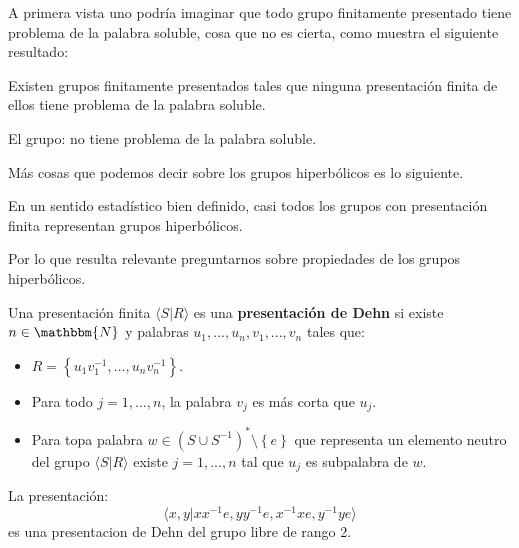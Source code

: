 \documentclass[12pt]{report}
\theoremstyle{largebreak}
\newcommand{\bbm}[1]{\ensuremath{\mathbbm{#1}}}
\newcommand{\gen}[1]{\ensuremath{\langle#1\rangle}}
\begin{document}
    A primera vista uno podría imaginar que todo grupo finitamente presentado tiene problema de la palabra soluble, cosa que no es cierta, como muestra el siguiente resultado:

    \begin{theor}
        Existen grupos finitamente presentados tales que ninguna presentación finita de ellos tiene problema de la palabra soluble.
    \end{theor}

    \begin{exa}
        El grupo:
        no tiene problema de la palabra soluble.
    \end{exa}

    Más cosas que podemos decir sobre los grupos hiperbólicos es lo siguiente.

    \begin{theor}
        En un sentido estadístico bien definido, casi todos los grupos con presentación finita representan grupos hiperbólicos.
    \end{theor}

    Por lo que resulta relevante preguntarnos sobre propiedades de los grupos hiperbólicos.

    \begin{mydef}
        Una presentación finita $\gen{S|R}$ es una \textbf{presentación de Dehn} si existe $n\in\bbm{N}$ y palabras $u_1,...,u_n,v_1,...,v_n$ tales que:
        \begin{itemize}
            \item $R=\left\{u_1v_1^{-1},...,u_nv_n^{-1} \right\}$.
            \item Para todo $j=1,...,n$, la palabra $v_j$ es más corta que $u_j$.
            \item Para topa palabra $w\in(S\cup S^{-1})^*\setminus\left\{e\right\}$ que representa un elemento neutro del grupo $\gen{S|R}$ existe $j=1,...,n$ tal que $u_j$ es subpalabra de $w$.
        \end{itemize}
    \end{mydef}

    \begin{exa}
        La presentación:
        \begin{equation*}
            \gen{x,y|xx^{-1}e,yy^{-1}e,x^{-1}xe,y^{-1}ye}
        \end{equation*}
        es una presentacion de Dehn del grupo libre de rango 2.
    \end{exa}
\end{document}
